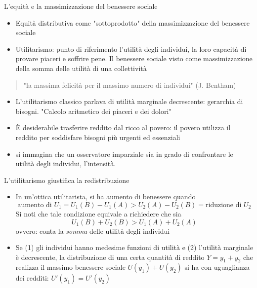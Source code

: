 \documentclass[11pt]{beamer}
\begin{document}
\begin{frame}{L'equità e la massimizzazione del benessere sociale}
\begin{itemize}
\item \alert{Equità distributiva} come "sottoprodotto" della massimizzazione del
benessere sociale
\item \alert{Utilitarismo}: punto di riferimento l'utilità degli individui, la loro
capacità di provare piaceri e soffrire pene. Il benessere sociale visto come
massimizzazione della somma delle utilità di una collettività
\end{itemize}
\begin{quote}
"la massima felicità per il massimo numero di individui" (J. Bentham)
\end{quote}
\begin{itemize}
\item L'utilitarismo classico parlava di utilità marginale decrescente: gerarchia
di bisogni. "Calcolo aritmetico dei piaceri e dei dolori"
\item È desiderabile trasferire reddito dal ricco al povero: il povero utilizza il
reddito per soddisfare bisogni più urgenti ed essenziali
\item si immagina che un osservatore imparziale sia in grado di confrontare le
utilità degli individui, l'intensità.
\end{itemize}
\end{frame}

\begin{frame}{L'utilitarismo giustifica la redistribuzione}
\begin{itemize}
\item In un'ottica utilitarista, si ha aumento di benessere quando 
\begin{equation*}
\text{aumento di $U_{1}$} = U_{1}(B)-U_{1}(A) > U_{2}(A)-U_{2}(B) =
\text{riduzione di $U_{2}$}
\end{equation*}
Si noti che tale condizione equivale a richiedere che sia
\begin{equation*}
U_{1}(B)+U_{2}(B) >  U_{1}(A)+U_{2}(A)
\end{equation*}
ovvero: conta la \emph{somma} delle utilità degli individui
\item Se (1) gli individui hanno medesime funzioni di utilità e (2) l'utilità
marginale è decrescente, la distribuzione di una certa quantità di reddito
$Y=y_1+y_2$ che realizza il massimo benessere sociale $U(y_1)+U(y_2)$ si ha con
uguaglianza dei redditi: $U'(y_{1})=U'(y_{2})$
\end{itemize}
\end{frame}
\end{document}
